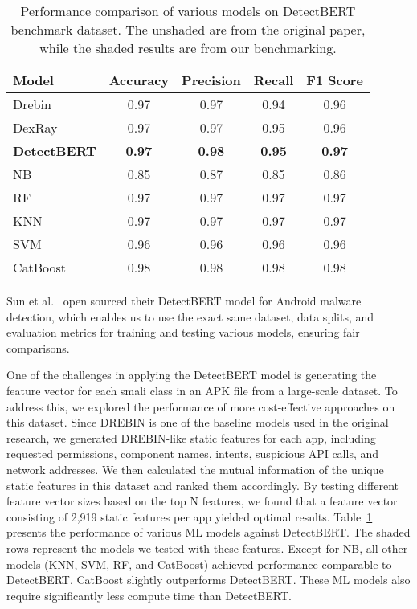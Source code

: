 \begin{table}[t]
    \centering
    \begin{tabular}{lcccc}
        \toprule[0.8pt]
        \textbf{Model} & \textbf{Accuracy} & \textbf{Precision} & \textbf{Recall} & \textbf{F1 Score} \\
        \hline
        Drebin & 0.97 & 0.97 & 0.94 & 0.96 \\
        DexRay & 0.97 & 0.97 & 0.95 & 0.96 \\
        \textbf{DetectBERT} & \textbf{0.97} & \textbf{0.98} & \textbf{0.95} & \textbf{0.97} \\

        \midrule\midrule
        \rowcolor{gray!20} NB & 0.85 & 0.87 & 0.85 & 0.86 \\
        \rowcolor{gray!20} RF & 0.97 & 0.97 & 0.97 & 0.97 \\
        \rowcolor{gray!20} KNN & 0.97 & 0.97 & 0.97 & 0.97 \\
        \rowcolor{gray!20} SVM & 0.96 & 0.96 & 0.96 & 0.96 \\
        \rowcolor{gray!20} CatBoost & 0.98 & 0.98 & 0.98 & 0.98 \\
        \bottomrule[0.8pt]
    \end{tabular}
    \vspace{10pt}
    \caption{Performance comparison of various models on DetectBERT benchmark dataset. The unshaded are from the original paper, while the  shaded results are from our benchmarking.}
    \label{tab:detectbert_comparison}
    \vspace{-.2in}
  \end{table}

Sun et al.~\cite{Sun:esem24} open sourced their DetectBERT model for
Android malware detection, which enables us to use the exact same
dataset, data splits, and evaluation metrics for training and testing
various models, ensuring fair comparisons.

One of the challenges in applying the DetectBERT model is generating
the feature vector for each smali class in an APK file from a
large-scale dataset. To address this, we explored the performance of
more cost-effective approaches on this dataset.  Since DREBIN is one
of the baseline models used in the original research, we generated DREBIN-like static features for
each app, including requested permissions, component names, intents,
suspicious API calls, and network addresses. We then calculated the
mutual information of the unique static features in this dataset and
ranked them accordingly. By testing different feature vector sizes
based on the top N features, we found that a feature vector consisting
of 2,919 static features per app yielded optimal
results.  Table~\ref{tab:detectbert_comparison} presents the
performance of various ML models against DetectBERT. The shaded rows represent the models we tested with
these features. Except for NB, all other
models (KNN, SVM, RF, and CatBoost) achieved performance comparable to
DetectBERT. CatBoost slightly outperforms DetectBERT.
These ML models also require significantly less compute
time than DetectBERT.

